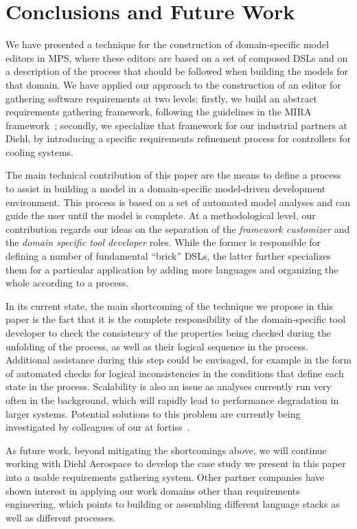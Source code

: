 \section{Conclusions and Future Work}
\label{sec:conclusion}
 \vspace{-.4cm}
We have presented a technique for the construction of
domain-specific model editors in MPS, where these editors are based on
a set of composed DSLs and on a description of the process that
should be followed when building the models for that domain. We have applied our
approach to the construction of an editor for gathering software requirements
at two levels: firstly, we build an abstract requirements gathering framework,
following the guidelines in the MIRA framework~\cite{MIRA13}; secondly, we
specialize that framework for our industrial partners at Diehl, by introducing
a specific requirements refinement process for controllers for cooling systems.

The main technical contribution of this paper are the means to define a process
to assist in building a model in a domain-specific model-driven development
environment. This process is based on a set of automated model analyses and can
guide the user until the model is complete.
At a methodological level, our contribution regards our ideas on the separation
of the \emph{framework customizer} and the  \emph{domain specific tool
developer} roles. While the former is responsible for defining a number of
fundamental ``brick'' DSLs, the latter further specializes them for a particular
application by adding more languages and organizing the whole according to a
process.

In its current state, the main shortcoming of the technique we propose in this
paper is the fact that it is the complete responsibility of the domain-specific
tool developer to check the consistency of the properties being checked during
the unfolding of the process, as well as their logical sequence in the process.
Additional assistance during this step could be envisaged, for example in the
form of automated checks for logical inconsistencies in the conditions that
define each state in the process. Scalability is also an issue as analyses
currently run very often in the background, which will rapidly lead to
performance degradation in larger systems. Potential solutions to this problem
are currently being investigated by colleagues of our at
fortiss~\cite{Models17Sudeep}.

As future work, beyond mitigating the shortcomings above, we will continue
working with Diehl Aerospace to develop the case study we present in this paper
into a usable requirements gathering system. Other partner companies have shown
interest in applying our work domains other than requirements engineering, which
points to building or assembling different language stacks as well as different
processes.
 \vspace{-.6cm}
